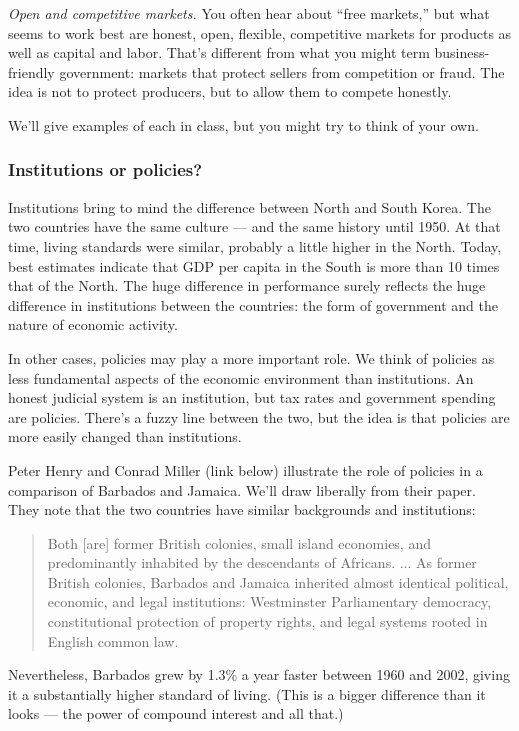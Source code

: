 \documentclass[letterpaper,12pt]{article}
\begin{document}
{\it Open and competitive markets.\/}
You often hear about ``free markets,''
but what seems to work best are honest, open, flexible, competitive markets
for products as well as capital and labor.
That's different from what you might term business-friendly government:
markets that protect sellers from competition or fraud.
The idea is not to protect producers,
but to allow them to compete honestly.

We'll give examples of each in class, but you might try to think of your own.


\subsubsection*{Institutions or policies?}

Institutions bring to mind the difference between North and South Korea.
The two countries have the same culture ---
and the same history until 1950.
At that time, living standards were similar,
probably a little higher in the North.
Today, best estimates indicate that GDP per capita in the South
is more than 10 times that of the North.
The huge difference in performance surely reflects the huge difference
in institutions between the countries:
the form of government and the nature of economic activity.


In other cases, policies may play a more important role.
We think of policies as less fundamental aspects of
the economic environment than institutions.
An honest judicial system is an institution,
but tax rates and government spending are policies.
There's a fuzzy line between the two,
but the idea is that policies are more easily
changed than institutions.

Peter Henry and Conrad Miller (link below) illustrate
the role of policies in a comparison
of Barbados and Jamaica.
We'll draw liberally from their paper.
They note that the two countries have similar backgrounds and institutions:
\begin{quote}
Both [are] former British colonies,
small island economies,
and predominantly inhabited by the descendants of Africans. ...
As former British colonies, Barbados and
Jamaica inherited almost identical political,
economic, and legal institutions: Westminster
Parliamentary democracy, constitutional protection of property rights,
and legal systems rooted in English common law.
\end{quote}
Nevertheless,
Barbados grew by 1.3\% a year faster between 1960 and 2002,
giving it a substantially higher standard of living.
(This is a bigger difference than it looks --- the power
of compound interest and all that.)
\end{document}

